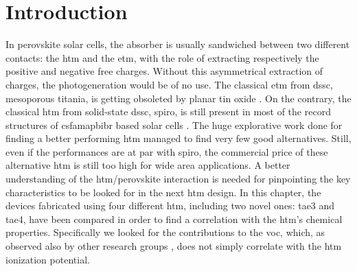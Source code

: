 


\section{Introduction}
In perovskite solar cells, the absorber is usually sandwiched between two different contacts: the \gls{htm} and the \gls{etm}, with the role of extracting respectively the positive and negative free charges.
Without this asymmetrical extraction of charges, the photogeneration would be of no use.
The classical \gls{etm} from \gls{dssc}, mesoporous titania, is getting obsoleted by planar tin oxide \cite{Jiang2018}.
On the contrary, the classical \gls{htm} from solid-state \gls{dssc}, \gls{spiro}, is still present in most of the record structures of \gls{csfamapbibr} based solar cells \cite{Saliba2016,Saliba2018}.
The huge explorative work done for finding a better performing \gls{htm} managed to find very few good alternatives.%
Still, even if the performances are at par with \gls{spiro}, the commercial price of these alternative \gls{htm} is still too high for wide area applications.
A better understanding of the \gls{htm}\-/perovskite interaction is needed for pinpointing the key characteristics to be looked for in the next \gls{htm} design.
In this chapter, the devices fabricated using four different \gls{htm}, including two novel ones: \gls{tae3} and \gls{tae4}, have been compared in order to find a correlation with the \gls{htm}'s chemical properties.
Specifically we looked for the contributions to the \gls{voc}, which, as observed also by other research groups \cite{Correa-Baena2017,Belisle2016}, does not simply correlate with the \gls{htm} ionization potential.

